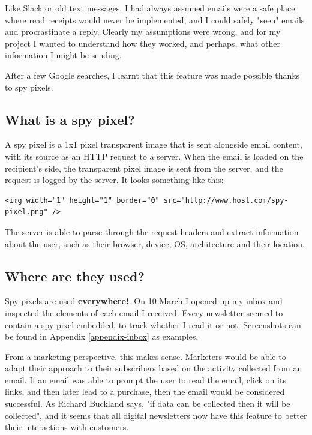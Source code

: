 \documentclass{article}
\begin{document}
Like Slack or old text messages, I had always assumed emails were a safe place where read receipts would never be implemented, and I could safely "seen" emails and procrastinate a reply. Clearly my assumptions were wrong, and for my project I wanted to understand how they worked, and perhaps, what other information I might be sending.

After a few Google searches, I learnt that this feature was made possible thanks to spy pixels.

\subsection{What is a spy pixel?}

A spy pixel is a 1x1 pixel transparent image that is sent alongside email content, with its source as an HTTP request to a server. When the email is loaded on the recipient's side, the transparent pixel image is sent from the server, and the request is logged by the server. It looks something like this:
\begin{lstlisting}
<img width="1" height="1" border="0" src="http://www.host.com/spy-pixel.png" />
\end{lstlisting}

The server is able to parse through the request headers and extract information about the user, such as their browser, device, OS, architecture and their location.

\subsection{Where are they used?}

Spy pixels are used \textbf{everywhere!}. On 10 March I opened up my inbox and inspected the elements of each email I received. Every newsletter seemed to contain a spy pixel embedded, to track whether I read it or not. Screenshots can be found in Appendix \ref{appendix-inbox} as examples.

From a marketing perspective, this makes sense. Marketers would be able to adapt their approach to their subscribers based on the activity collected from an email. If an email was able to prompt the user to read the email, click on its links, and then later lead to a purchase, then the email would be considered successful. As Richard Buckland says, "if data can be collected then it will be collected", and it seems that all digital newsletters now have this feature to better their interactions with customers.
\end{document}

